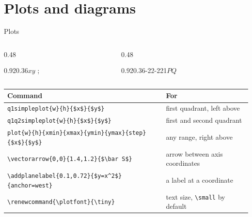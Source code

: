 \documentclass[aspectratio=169,10pt]{beamer}
\begin{document}
\section{Plots and diagrams}

\begin{frame}[fragile]{Plots}
  \begin{columns}[T,onlytextwidth]
    \begin{column}{0.48\textwidth}
      \centering
      \begin{q1simpleplot}{0.92\textwidth}{0.36\textheight}{$x$}{$y$}
        ;
      \end{q1simpleplot}

    \end{column}
    \begin{column}{0.48\textwidth}
      \centering
      {\renewcommand{\plotfont}{\tiny}%
      \begin{plot}{0.92\textwidth}{0.36\textheight}{-2}{2}{-2}{2}{1}{$P$}{$Q$}
      \end{plot}}

    \end{column}
  \end{columns}

  \vspace{0.1em}
  \centering
  \footnotesize
  \renewcommand{\arraystretch}{1.15}
  \begin{tabular}{@{}l@{\qquad}l@{}}
    \toprule
    \textbf{Command} & \textbf{For} \\
    \midrule
    \verb|q1simpleplot{w}{h}{$x$}{$y$}| & first quadrant, left above \\
    \verb|q1q2simpleplot{w}{h}{$x$}{$y$}| & first and second quadrant \\
    \verb|plot{w}{h}{xmin}{xmax}{ymin}{ymax}{step}{$x$}{$y$}| & any range, right above \\
    \verb|\vectorarrow{0,0}{1.4,1.2}{$\bar S$}| & arrow between axis coordinates \\
    \verb|\addplanelabel{0.1,0.72}{$y=x^2$}{anchor=west}| & a label at a coordinate \\
    \verb|\renewcommand{\plotfont}{\tiny}| & text size, \verb|\small| by default \\
    \bottomrule
  \end{tabular}
\end{frame}
\end{document}
